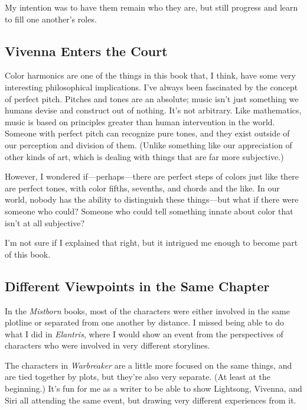 My intention was to have them remain who they are, but still progress and learn to fill one another’s roles.

\subsection*{Vivenna Enters the Court}

Color harmonics are one of the things in this book that, I think, have some very interesting philosophical implications. I’ve always been fascinated by the concept of perfect pitch. Pitches and tones are an absolute; music isn’t just something we humans devise and construct out of nothing. It’s not arbitrary. Like mathematics, music is based on principles greater than human intervention in the world. Someone with perfect pitch can recognize pure tones, and they exist outside of our perception and division of them. (Unlike something like our appreciation of other kinds of art, which is dealing with things that are far more subjective.)

However, I wondered if—perhaps—there are perfect steps of colors just like there are perfect tones, with color fifths, sevenths, and chords and the like. In our world, nobody has the ability to distinguish these things—but what if there were someone who could? Someone who could tell something innate about color that isn’t at all subjective?

I’m not sure if I explained that right, but it intrigued me enough to become part of this book.

\subsection*{Different Viewpoints in the Same Chapter}

In the \textit{Mistborn} books, most of the characters were either involved in the same plotline or separated from one another by distance. I missed being able to do what I did in \textit{Elantris}, where I would show an event from the perspectives of characters who were involved in very different storylines.

The characters in \textit{Warbreaker} are a little more focused on the same things, and are tied together by plots, but they’re also very separate. (At least at the beginning.) It’s fun for me as a writer to be able to show Lightsong, Vivenna, and Siri all attending the same event, but drawing very different experiences from it.




